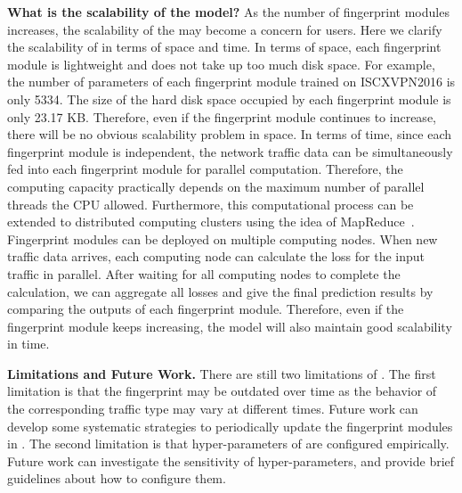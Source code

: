 \textbf{What is the scalability of the model?} As the number of fingerprint modules increases, the scalability of the \sys may become a concern for users.
Here we clarify the scalability of \sys in terms of space and time. 
In terms of space, each fingerprint module is lightweight and does not take up too much disk space.
For example, the number of parameters of each fingerprint module trained on ISCXVPN2016 is only 5334. 
The size of the hard disk space occupied by each fingerprint module is only 23.17 KB. 
Therefore, even if the fingerprint module continues to increase, there will be no obvious scalability problem in space. 
In terms of time, since each fingerprint module is independent, the network traffic data can be simultaneously fed into each fingerprint module for parallel computation. 
Therefore, the computing capacity practically depends on the maximum number of parallel threads the CPU allowed. 
Furthermore, this computational process can be extended to distributed computing clusters using the idea of MapReduce~\cite{dean2008mapreduce}.
Fingerprint modules can be deployed on multiple computing nodes.
When new traffic data arrives, each computing node can calculate the loss for the input traffic in parallel.
After waiting for all computing nodes to complete the calculation, we can aggregate all losses and give the final prediction results by comparing the outputs of each fingerprint module. 
Therefore, even if the fingerprint module keeps increasing, the model will also maintain good scalability in time.

\textbf{Limitations and Future Work.} There are still two limitations of \sys. 
The first limitation is that the fingerprint may be outdated over time as the behavior of the corresponding traffic type may vary at different times.
Future work can develop some systematic strategies to periodically update the fingerprint modules in \sys. 
The second limitation is that hyper-parameters of \sys are configured empirically. 
Future work can investigate the sensitivity of hyper-parameters, and provide brief guidelines about how to configure them.



